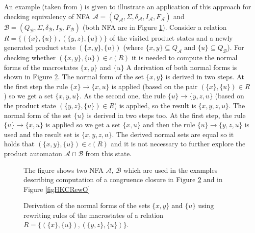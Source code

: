 An example (taken from \cite{popl13}) is given to illustrate an application of this approach for checking equivalency of 
NFA $\mathcal{A}=(Q_\mathcal{A},\Sigma,\delta_\mathcal{A},I_\mathcal{A},F_\mathcal{A})$ 
and $\mathcal{B}=(Q_\mathcal{B},\Sigma,\delta_\mathcal{B},I_\mathcal{B},F_\mathcal{B})$ (both NFA are in Figure \ref{figHKCex}). 
Consider a relation $R=\{(\{x\},\{u\}),(\{y,z\},\{u\})\}$ of the visited product states and a newly generated product state 
$(\{x,y\},\{u\})$ (where $\{x,y\}\subseteq Q_\mathcal{A}$ and 
$\{u\} \subseteq Q_\mathcal{B}$). For checking whether $(\{x,y\},\{u\})\in c(R)$ it is needed to compute the normal forms of the macrostates $\{x,y\}$ and $\{u\}$ 
A derivation of both normal forms is shown in Figure \ref{figHKCRew}. 
The normal form of the set $\{x,y\}$ is derived in two steps.
At the first step the rule $\{x\}\rightarrow\{x,u\}$ is applied (based on the pair $(\{x\},\{u\})\in R$) so we get a set $\{x,y,u\}$. As the second one, the rule 
$\{u\}\rightarrow\{y,z,u\}$ (based on the product state $(\{y,z\},\{u\})\in R$) is applied, so the result is $\{x,y,z,u\}$. The normal form of the set $\{u\}$
is derived in two steps too. At the first step, the rule $\{u\}\rightarrow\{x,u\}$ is applied so we get a set $\{x,u\}$ and then the rule 
$\{u\}\rightarrow\{y,z,u\}$ is used and the result set is $\{x,y,z,u\}$. The derived normal sets are equal so it holds that $(\{x,y\},\{u\})\in c(R)$ and
it is not necessary to further explore the product automaton $\mathcal{A}\cap \mathcal{B}$ from this state.

\begin{figure}[tb]
\begin{center}
  
  
    \caption{The figure shows two NFA $\mathcal{A}$, $\mathcal{B}$ 
      which are used in the examples describing computation of a congruence closure in Figure \ref{figHKCRew} and in Figure \ref{figHKCRewO}}
		\label{figHKCex}
\end{center}
\end{figure}

\begin{figure}[bt]
  \begin{center}
    
    \caption{Derivation of the normal forms of the sets $\{x,y\}$ and $\{u\}$ using rewriting
      rules of the macrostates of a relation $R=\{(\{x\},\{u\}),(\{y,z\},\{u\})\}$.}
    \label{figHKCRew}
  \end{center}
\end{figure}

